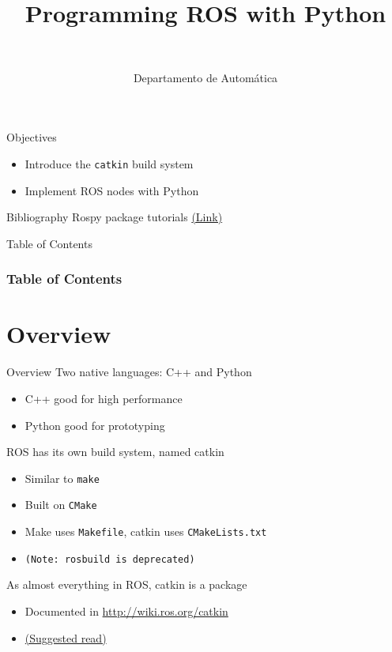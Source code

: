\documentclass[10pt,compress]{beamer} %
\title[Programming ROS with Python]{Programming ROS with Python}
\author{\asignatura\\\carrera}
\institute{}
\date{Departamento de Automática}
\begin{document}
{\titlepageBlue
    \begin{frame}
        \titlepage
    \end{frame}
}

\begin{frame}[plain]{}
   \begin{block}{Objectives}
       \begin{itemize}
	   	\item Introduce the \texttt{catkin} build system
       	\item Implement ROS nodes with Python
       \end{itemize}
   \end{block}

   \begin{block}{Bibliography}
       Rospy package tutorials \href{http://wiki.ros.org/rospy/Tutorials}{(Link)}
   \end{block}

\end{frame}

{
\begin{frame}[shrink]{Table of Contents}
 \frametitle{Table of Contents}
 \tableofcontents
\end{frame}
}

\section{Overview}

\begin{frame}{Overview}
	Two native languages: C++ and Python
	\begin{itemize}
		\item C++ good for high performance
		\item Python good for prototyping
  	\end{itemize}
	ROS has its own build system, named \alert{catkin}
	\begin{itemize}
		\item Similar to \texttt{make}
		\item Built on \texttt{CMake}
		\item Make uses \texttt{Makefile}, catkin uses \texttt{CMakeLists.txt}
		\item[] \texttt{(Note: \texttt{rosbuild} is deprecated)}
  	\end{itemize}
	As almost everything in ROS, catkin is a package
	\begin{itemize}
		\item Documented in \url{http://wiki.ros.org/catkin}
		\item \href{http://wiki.ros.org/catkin/conceptual\_overview}{(Suggested read)}
	\end{itemize}
\end{frame}
\end{document}
